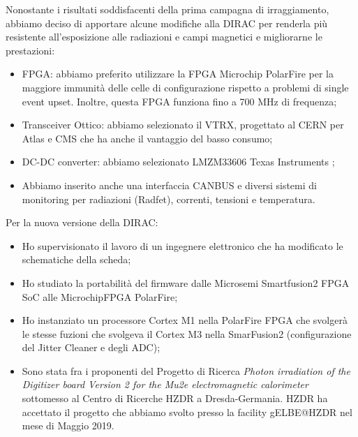\documentclass[10pt]{article}
\begin{document}
 Nonostante i risultati soddisfacenti della prima campagna di irraggiamento, abbiamo deciso di apportare alcune modifiche alla DIRAC per renderla  pi\`u resistente all'esposizione alle radiazioni e campi magnetici e migliorarne le prestazioni:
 \begin{itemize}
 \item {FPGA}: abbiamo preferito utilizzare la FPGA Microchip\textsuperscript{\textregistered} PolarFire 
 per la maggiore immunit\`a delle celle di configurazione rispetto a problemi di single event upset.
 Inoltre, questa FPGA funziona fino a 700 MHz di frequenza; 
 \item {Transceiver Ottico}: abbiamo selezionato il VTRX, progettato al CERN per Atlas e CMS
  che ha anche il vantaggio del basso consumo;
 \item {DC-DC converter}: abbiamo selezionato LMZM33606 Texas Instruments \textsuperscript{\textregistered};
 \item Abbiamo inserito anche una interfaccia CANBUS e diversi sistemi di monitoring per  radiazioni (Radfet), correnti, tensioni e temperatura. 
\end{itemize}
\noindent
Per la nuova versione della DIRAC:  
\begin{itemize}
\item Ho supervisionato il lavoro di un ingegnere elettronico che ha modificato le schematiche della scheda;
\item Ho studiato la portabilit\`a del firmware dalle Microsemi\textsuperscript{\textregistered} Smartfusion2 FPGA SoC alle Microchip\textsuperscript{\textregistered}FPGA PolarFire;
\item Ho instanziato un processore Cortex M1 nella PolarFire FPGA che svolger\`a le stesse fuzioni che svolgeva il Cortex M3 nella SmarFusion2 (configurazione del Jitter Cleaner e degli ADC);
\item Sono stata fra i proponenti del Progetto di Ricerca \emph{Photon irradiation of the Digitizer board Version 2 for the Mu2e electromagnetic calorimeter} sottomesso al Centro di Ricerche HZDR a Dresda-Germania. HZDR ha accettato 
il progetto che abbiamo svolto presso la facility gELBE@HZDR nel mese di Maggio 2019.
\end{itemize}
\end{document}
